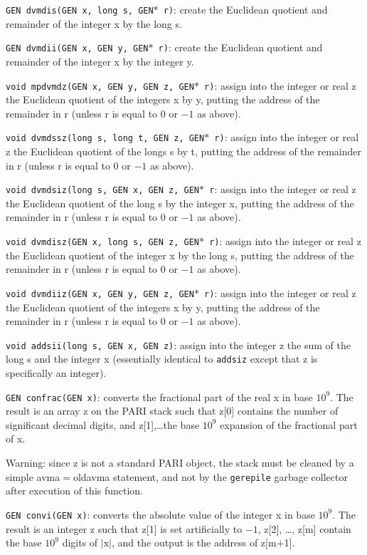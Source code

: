 {\tt GEN dvmdis(GEN x, long s, GEN$*$ r)}: create the Euclidean quotient and
remainder of the integer x by the long s.

{\tt GEN dvmdii(GEN x, GEN y, GEN$*$ r)}: create the Euclidean quotient and
remainder of the integer x by the integer y.

{\tt void mpdvmdz(GEN x, GEN y, GEN z, GEN$*$ r)}: assign into the integer or
real z the Euclidean quotient of the integers x by y, putting the address of 
the remainder in r (unless r is equal to 0 or $-1$ as above).

{\tt void dvmdssz(long s, long t, GEN z, GEN$*$ r)}: assign into the integer or
real z the Euclidean quotient of the longs s by t, putting the address of 
the remainder in r (unless r is equal to 0 or $-1$ as above).

{\tt void dvmdsiz(long s, GEN x, GEN z, GEN$*$ r}: assign into the integer or
real z the Euclidean quotient of the long s by the integer x, putting the
address of the remainder in r (unless r is equal to 0 or $-1$ as above).

{\tt void dvmdisz(GEN x, long s, GEN z, GEN$*$ r)}: assign into the integer or
real z the Euclidean quotient of the integer x by the long s, putting the
address of the remainder in r (unless r is equal to 0 or $-1$ as above).

{\tt void dvmdiiz(GEN x, GEN y, GEN z, GEN$*$ r)}: assign into the integer or
real z the Euclidean quotient of the integers x by y, putting the address of 
the remainder in r (unless r is equal to 0 or $-1$ as above).


{\tt void addsii(long s, GEN x, GEN z)}: assign into the integer z the sum of
the long s and the integer x (essentially identical to {\tt addsiz} except
that z is specifically an integer).

{\tt GEN confrac(GEN x)}: converts the fractional part of the real x in base
$10^9$. The result is an array z on the PARI stack such that z[0] contains
the number of significant decimal digits, and z[1],\dots the base $10^9$
expansion of the fractional part of x.

Warning: since z is not a standard PARI object, the stack must be cleaned by
a simple avma$=$oldavma statement, and not by the {\tt gerepile} garbage
collector after execution of this function.

{\tt GEN convi(GEN x)}: converts the absolute value of the integer x in base
$10^9$. The result is an integer z such that z[1] is set artificially to 
$-1$, z[2], \dots, z[m] contain the base $10^9$ digits of $|\text{x}|$, and
the output is the address of z[m$+$1].

